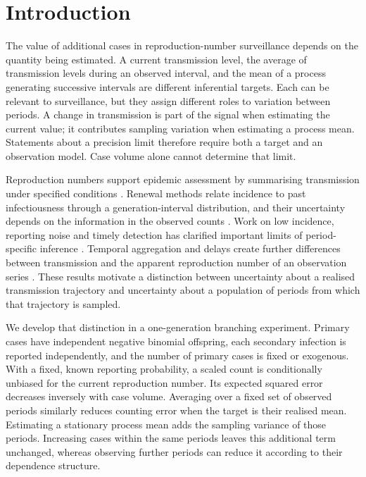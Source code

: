 \section{Introduction}
\label{sec:intro}

The value of additional cases in reproduction-number surveillance depends on the quantity being estimated. A current transmission level, the average of transmission levels during an observed interval, and the mean of a process generating successive intervals are different inferential targets. Each can be relevant to surveillance, but they assign different roles to variation between periods. A change in transmission is part of the signal when estimating the current value; it contributes sampling variation when estimating a process mean. Statements about a precision limit therefore require both a target and an observation model. Case volume alone cannot determine that limit.

Reproduction numbers support epidemic assessment by summarising transmission under specified conditions \citep{fraser2007estimating, gostic2020practical}. Renewal methods relate incidence to past infectiousness through a generation-interval distribution, and their uncertainty depends on the information in the observed counts \citep{cori2013new, thompson2019improved}. Work on low incidence, reporting noise and timely detection has clarified important limits of period-specific inference \citep{parag2021improved, parag2022quantifying, parag2025asymmetric}. Temporal aggregation and delays create further differences between transmission and the apparent reproduction number of an observation series \citep{nash2023estimating, ogigittins2024simulation, eales2024differences}. These results motivate a distinction between uncertainty about a realised transmission trajectory and uncertainty about a population of periods from which that trajectory is sampled.

We develop that distinction in a one-generation branching experiment. Primary cases have independent negative binomial offspring, each secondary infection is reported independently, and the number of primary cases is fixed or exogenous. With a fixed, known reporting probability, a scaled count is conditionally unbiased for the current reproduction number. Its expected squared error decreases inversely with case volume. Averaging over a fixed set of observed periods similarly reduces counting error when the target is their realised mean. Estimating a stationary process mean adds the sampling variance of those periods. Increasing cases within the same periods leaves this additional term unchanged, whereas observing further periods can reduce it according to their dependence structure.

